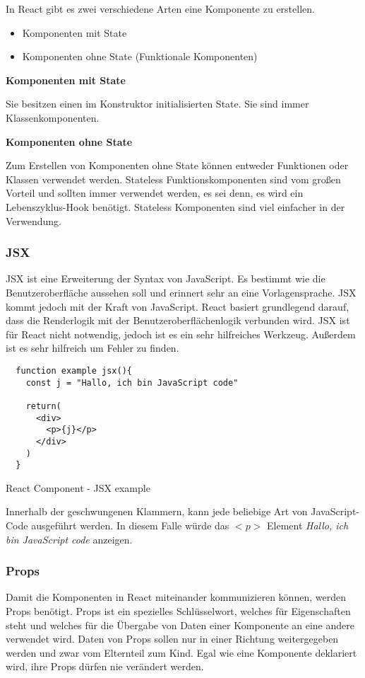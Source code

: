 In React gibt es zwei verschiedene Arten eine Komponente zu erstellen.
\begin{itemize}
  \item Komponenten mit State
  \item Komponenten ohne State (Funktionale Komponenten)\\
\end{itemize}

\centerline{\textbf{Komponenten mit State}}
Sie besitzen einen im Konstruktor initialisierten State. Sie sind immer Klassenkomponenten.\\

\centerline{\textbf{Komponenten ohne State}}
Zum Erstellen von Komponenten ohne State können entweder Funktionen oder Klassen verwendet werden.
Stateless Funktionskomponenten sind vom großen Vorteil und sollten immer verwendet werden, es sei 
denn, es wird ein Lebenszyklus-Hook benötigt. Stateless Komponenten sind viel einfacher in der
Verwendung.\cite{KompState} 

\subsubsection{JSX}
\label{jsx}
JSX ist eine Erweiterung der Syntax von JavaScript. Es bestimmt wie die Benutzeroberfläche aussehen soll
und erinnert sehr an eine Vorlagensprache. JSX kommt jedoch mit der Kraft von JavaScript. React basiert 
grundlegend darauf, dass die Renderlogik mit der Benutzeroberflächenlogik verbunden wird. JSX ist 
für React nicht notwendig, jedoch ist es ein sehr hilfreiches Werkzeug. 
Außerdem ist es sehr hilfreich um Fehler zu finden.
\begin{code}[htp]
\begin{lstlisting}
  function example jsx(){
    const j = "Hallo, ich bin JavaScript code"

    return(
      <div>
        <p>{j}</p>
      </div>
    )
  }
\end{lstlisting}
\caption{React Component - JSX example }
\end{code}
Innerhalb der geschwungenen Klammern, kann jede beliebige Art von JavaScript-Code ausgeführt werden.
In diesem Falle würde das $<p>$ Element \textit{Hallo, ich bin JavaScript code} anzeigen.
~\cite{JSX}

\subsubsection{Props}

 Damit die Komponenten in React miteinander kommunizieren können, werden Props benötigt. Props ist ein
 spezielles Schlüsselwort, welches für Eigenschaften steht und welches für die Übergabe von 
 Daten einer Komponente an eine andere verwendet wird. Daten von Props sollen nur in einer 
 Richtung weitergegeben werden und zwar vom Elternteil zum Kind. Egal wie eine Komponente 
 deklariert wird, ihre Props dürfen nie verändert werden.\\

